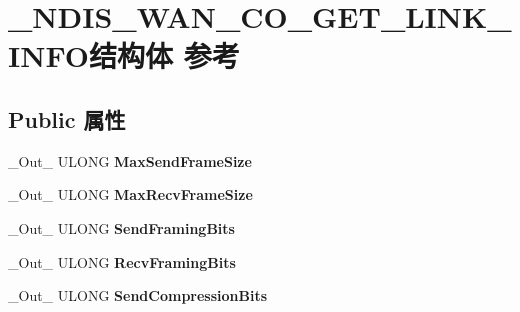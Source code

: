 \hypertarget{struct___n_d_i_s___w_a_n___c_o___g_e_t___l_i_n_k___i_n_f_o}{}\section{\+\_\+\+N\+D\+I\+S\+\_\+\+W\+A\+N\+\_\+\+C\+O\+\_\+\+G\+E\+T\+\_\+\+L\+I\+N\+K\+\_\+\+I\+N\+F\+O结构体 参考}
\label{struct___n_d_i_s___w_a_n___c_o___g_e_t___l_i_n_k___i_n_f_o}
\subsection*{Public 属性}
\begin{DoxyCompactItemize}
\item 
\mbox{\label{struct___n_d_i_s___w_a_n___c_o___g_e_t___l_i_n_k___i_n_f_o_a16db6c7616090af2be1070719cf9bc08}} 
\+\_\+\+Out\+\_\+ U\+L\+O\+NG {\bfseries Max\+Send\+Frame\+Size}
\item 
\mbox{\label{struct___n_d_i_s___w_a_n___c_o___g_e_t___l_i_n_k___i_n_f_o_a38618a27a865b0bb66de534a802cd7d0}} 
\+\_\+\+Out\+\_\+ U\+L\+O\+NG {\bfseries Max\+Recv\+Frame\+Size}
\item 
\mbox{\label{struct___n_d_i_s___w_a_n___c_o___g_e_t___l_i_n_k___i_n_f_o_aa6593a0cc9929e41e6dcf555a892b52f}} 
\+\_\+\+Out\+\_\+ U\+L\+O\+NG {\bfseries Send\+Framing\+Bits}
\item 
\mbox{\label{struct___n_d_i_s___w_a_n___c_o___g_e_t___l_i_n_k___i_n_f_o_acb75d2ae1aa6b96990028f7d571b1b3e}} 
\+\_\+\+Out\+\_\+ U\+L\+O\+NG {\bfseries Recv\+Framing\+Bits}
\item 
\mbox{\label{struct___n_d_i_s___w_a_n___c_o___g_e_t___l_i_n_k___i_n_f_o_ae8d144c50f768ba2f48022f6e408ad2e}} 
\+\_\+\+Out\+\_\+ U\+L\+O\+NG {\bfseries Send\+Compression\+Bits}
\item 
\mbox{\label{struct___n_d_i_s___w_a_n___c_o___g_e_t___l_i_n_k___i_n_f_o_a995eb71c991b8078516e54d95f745111}} 

\end{DoxyCompactItemize}
